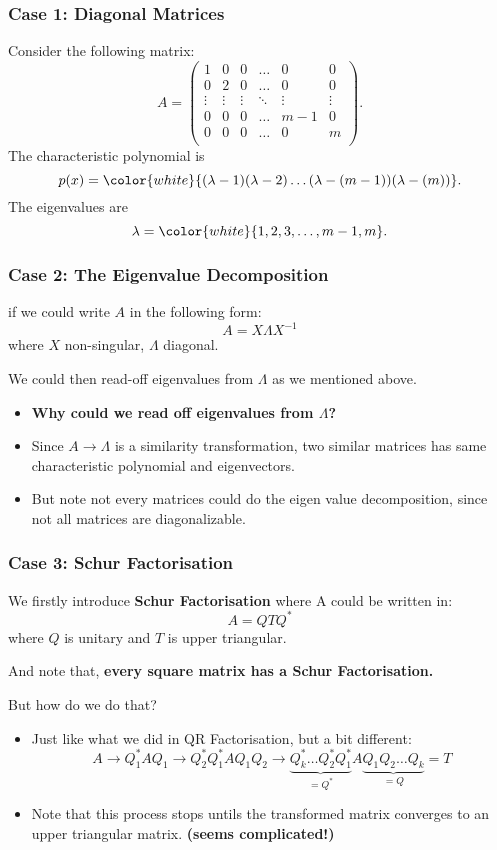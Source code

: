 \documentclass{beamer}
\begin{document}
\begin{frame}
    \frametitle{Case 1: Diagonal Matrices}
    Consider the following matrix:
    \[
        A = \begin{pmatrix} 
            1 & 0 & 0  & \ldots & 0 & 0 \\
            0 & 2 & 0  & \ldots & 0 & 0 \\
            \vdots & \vdots & \vdots & \ddots & \vdots & \vdots \\
            0 & 0 & 0 & \ldots & m - 1 & 0 \\
            0 & 0 & 0 & \ldots & 0 & m \\
        \end{pmatrix} 
    .\]
    The characteristic polynomial is 
    \[
        p(x) =\color{white}{(\lambda - 1)(\lambda - 2)\ldots(\lambda - (m - 1))(\lambda - (m))}  
    .\]
    The eigenvalues are
    \[
        \lambda = \color{white}{1, 2, 3, \ldots, m - 1, m}
    .\]
\end{frame}
\begin{frame}
    \frametitle{Case 2: The Eigenvalue Decomposition}
    if we could write \(A\) in the following form:
    \[
        A = X \Lambda X^{-1}
    \]
    where \(X\) non-singular, \(\Lambda \) diagonal. \medskip
    
    \noindent We could then read-off eigenvalues from \(\Lambda\) as we mentioned above.
    \begin{itemize}
        \item \textbf{Why could we read off eigenvalues from \(\Lambda \)?}
        \item Since \(A \to \Lambda \) is a similarity transformation, two similar matrices has same characteristic polynomial and eigenvectors.
        \item But note not every matrices could do the eigen value decomposition, since not all matrices are diagonalizable.
    \end{itemize}
\end{frame}

\begin{frame}
    \frametitle{Case 3: Schur Factorisation}
    We firstly introduce \textbf{Schur Factorisation} where A could be written in:
    \[
        A = QTQ^{*}
    \]
    where \(Q\) is unitary and \(T\) is upper triangular. \medskip
    
    \noindent And note that, \textbf{every square matrix has a Schur Factorisation.} \medskip
    
    \noindent But how do we do that?
    \begin{itemize}
        \item Just like what we did in QR Factorisation, but a bit different:
        \[
            A \to Q_1^{*}AQ_1 \to Q_2^{*}Q_1^{*}AQ_1Q_2 \to \underbrace{Q_k^{*} \ldots Q_2^{*}Q_1^{*}}_{=Q^{*}}A\underbrace{Q_1Q_2 \ldots Q_k}_{=Q} = T
        \]
        \item Note that this process stops untils the transformed matrix converges to an upper triangular matrix. \textbf{(seems complicated!)} 
    \end{itemize} 
\end{frame}
\end{document}
